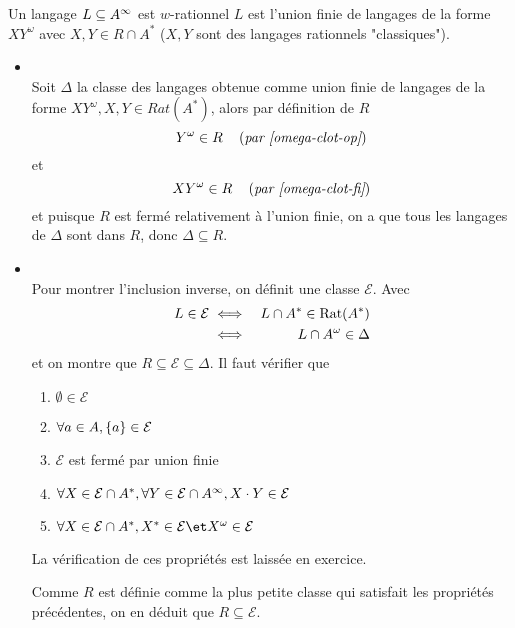 \begin{prop}
	Un langage $L \subseteq A^{\infty}$ est $w$-rationnel \ssi $L$ est l'union finie de langages
	de la forme $XY^{\omega}$ avec $X,Y \in R \cap A^*$ ($X,Y$ sont des langages rationnels "classiques").
\end{prop}

\begin{proofI}
	\begin{itemize}
		\item {} \\
		      Soit $\Delta$ la classe des langages obtenue comme union finie de langages de la forme $XY^{\omega}, X,Y \in Rat(A^*)$,
		      alors par définition de $R$
		      $$Y^{\omega} \in R \quad\left(\textit{par \ref{omega-clot-op}}\right)$$
		      et
		      $$XY^{\omega} \in R \quad\left(\textit{par \ref{omega-clot-fi}}\right)$$
		      et puisque $R$ est fermé relativement à l'union finie, on a que tous les langages de $\Delta$ sont dans $R$,
		      donc $\Delta \subseteq R$.
		\item {} \\

		      Pour montrer l'inclusion inverse, on définit une classe $\mathcal{E}$.
		      Avec
		      \begin{eqnarray*}
			      L \in \mathcal{E} &\iff& L \cap A^* \in \text{Rat}(A^*) \\
			      &\iff& L \cap A^{\omega} \in \Delta
		      \end{eqnarray*}
		      et on montre que $R \subseteq \mathcal{E} \subseteq \Delta$.
		      Il faut vérifier que
		      \begin{enumerate}
			      \item $\emptyset \in \mathcal{E}$
			      \item $\forall a \in A, \left\{a\right\} \in  \mathcal{E}$
			      \item $\mathcal{E}$ est fermé par union finie

			      \item $\forall X \in \mathcal{E} \cap A^*, \forall Y \in \mathcal{E} \cap A^{\infty}, X \cdot Y \in \mathcal{E}$
			      \item $\forall X \in \mathcal{E} \cap A^*, X^* \in \mathcal{E} \et X^{\omega} \in \mathcal{E}$
		      \end{enumerate}
		      La vérification de ces propriétés est laissée en exercice.

		      Comme $R$ est définie comme la plus petite classe qui satisfait
		      les propriétés précédentes, on en déduit que $R \subseteq \mathcal{E}$.
	\end{itemize}
\end{proofI}


